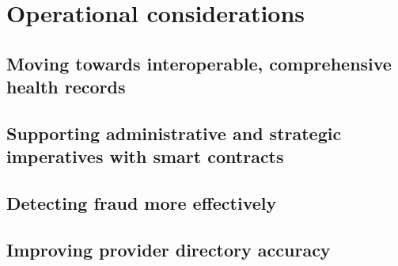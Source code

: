 \section{Operational considerations}
\subsection{Moving towards interoperable, comprehensive health records}
\subsection{Supporting administrative and strategic imperatives with smart contracts}
\subsection{Detecting fraud more effectively}
\subsection{Improving provider directory accuracy}
